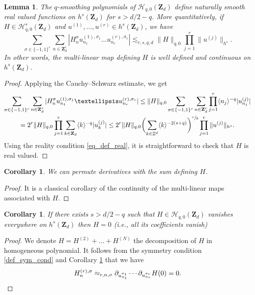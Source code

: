 \documentclass[11pt]{article}
\newcommand{\ie}{i.e.,\xspace}
\newtheorem{corollary}[theorem]{Corollary}
\newtheorem{lemma}[theorem]{Lemma}
\theoremstyle{definition}
\begin{document}
\begin{lemma}
\label{lem_val_ham}
The $q$-smoothing polynomials of $ \mathscr{H}_{q,0}(\mathbf{Z}_d)$ define naturally smooth real valued functions on $h^s(\mathbf{Z}_d)$ for $s > d/2-q$. More quantitatively, if $H\in \mathscr{H}_{q,0}^r(\mathbf{Z}_d)$ and $u^{(1)},\dots,u^{(r)} \in h^s(\mathbf{Z}_d)$, we have
\[
\sum_{\sigma \in \{-1,1\}^r} \sum_{n\in \mathbf{Z}_d^r } | H_{n}^{\sigma} u_{n_1}^{(1),\sigma_1} \dots u_{n_r}^{(r),\sigma_r} | \lesssim_{r,s,q,d} \| H \|_{q,0} \prod_{j=1}^r\|u^{(j)} \|_{h^s}.
\]
In other words, the multi-linear map defining $H$ is well defined and continuous on $h^s(\mathbf{Z}_d)$.
\end{lemma}
\begin{proof}
Applying the Cauchy--Schwarz estimate, we get
\begin{multline*}
\sum_{\sigma \in \{-1,1\}^r} \sum_{n\in \mathbf{Z}_d^r } | H_{n}^{\sigma} u_{n_1}^{(1),\sigma_1} \dots u_{n_r}^{(r),\sigma_r} | \leq \| H \|_{q,0} \sum_{\sigma \in \{-1,1\}^r} \sum_{n\in \mathbf{Z}_d^r } \prod_{j=1}^r \langle n_j \rangle^{-q} |u_{n_j}^{(j)} |
\\ = 2^r \| H \|_{q,0} \prod_{j=1}^r \sum_{k\in \mathbf{Z}_d } \langle k \rangle^{-q} |u_{k}^{(j)} | \leq 2^r \| H \|_{q,0} \biggl(\sum_{k\in \mathbb{Z}^d } \langle k \rangle^{-2(s+q)} \biggr)^{\sfrac{r}2} \prod_{j=1}^r\|u^{(j)} \|_{h^s}.
\end{multline*}
Using the reality condition \eqref{eq_def_real}, it is straightforward to check that $H$ is real valued.
\end{proof}

\begin{corollary}
\label{cor_permute_ok}
We can permute derivatives with the sum defining $H$.
\end{corollary}
\begin{proof} It is a classical corollary of the continuity of the multi-linear maps associated with $H$.
\end{proof}

\begin{corollary}
\label{cor_uniq}
If there exists $s>d/2-q$ such that $H\in \mathscr{H}_{q,0}(\mathbf{Z}_d)$ vanishes everywhere on $h^s(\mathbf{Z}_d)$ then $H=0$ (\ie all its coefficients vanish)
\end{corollary}
\begin{proof}
We denote $H = H^{(2)} + \dots + H^{(N)}$ the decomposition of $H$ in homogeneous polynomial. It follows from the symmetry condition \eqref{def_sym_cond} and Corollary \ref{cor_permute_ok} that we have
\[
H^{(r),\sigma}_n \approx_{r,n,\sigma} \partial_{u_{n_1}^{\sigma_1}} \cdots \partial_{u_{n_{r}}^{\sigma_{r}}} H(0) = 0.\qedhere
\]
\end{proof}
\end{document}
